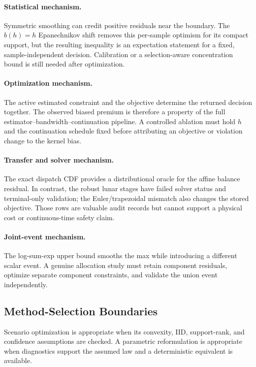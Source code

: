 \paragraph*{Statistical mechanism.}
Symmetric smoothing can credit positive residuals near the boundary. The
$b(h)=h$ Epanechnikov shift removes this per-sample optimism for its compact
support, but the resulting inequality is an expectation statement for a fixed,
sample-independent decision. Calibration or a selection-aware concentration
bound is still needed after optimization.

\paragraph*{Optimization mechanism.}
The active estimated constraint and the objective determine the returned
decision together. The observed biased premium is therefore a property of the
full estimator--bandwidth--continuation pipeline. A controlled ablation must
hold $h$ and the continuation schedule fixed before attributing an objective or
violation change to the kernel bias.

\paragraph*{Transfer and solver mechanism.}
The exact dispatch CDF provides a distributional oracle for the affine balance
residual. In contrast, the robust lunar stages have failed solver status and
terminal-only validation; the Euler/trapezoidal mismatch also changes the
stored objective. Those rows are valuable audit records but cannot support a
physical cost or continuous-time safety claim.

\paragraph*{Joint-event mechanism.}
The log-sum-exp upper bound smooths the max while introducing a different
scalar event. A genuine allocation study must retain component residuals,
optimize separate component constraints, and validate the union event
independently.

\subsection{Method-Selection Boundaries}
\label{sec:discussion-selection}

Scenario optimization is appropriate when its convexity, IID, support-rank, and
confidence assumptions are checked. A parametric reformulation is appropriate
when diagnostics support the assumed law and a deterministic equivalent is
available.

